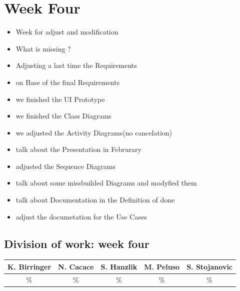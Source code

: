 \documentclass[a4paper, 12pt]{article}
\begin{document}
\section{Week Four}
\begin{itemize}
\item Week for adjust and modification
\item What is missing ? 
\item Adjusting a last time the Requirements 
\item on Base of the final Requirements
\item we finished the UI Prototype 
\item we finished the Class Diagrams
\item we adjusted the Activity Diagrams(no cancelation)
\item talk about the Presentation in Februrary
\item adjusted the Sequence Diagrams
\item talk about some missbuilded Diagrams and modyfied them
\item talk about Documentation in the Definition of done
\item adjust the documetation for the Use Cases 
\end{itemize}

\subsection{Division of work: week four}

\begin{table}[h]
\centering
\setlength{\tabcolsep}{12pt}
\begin{tabular}{|c|c|c|c|c|}
\hline
K. Birringer & N. Cacace & S. Hanzlik & M. Peluso & S. Stojanovic\\
\hline
\% & \% & \% & \% & \% \\ 
\hline
\end{tabular}
\end{table}
\end{document}
